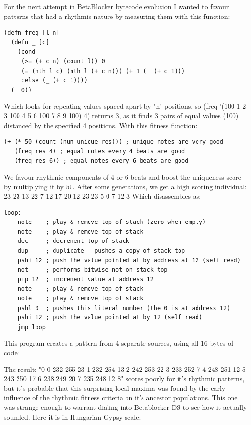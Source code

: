 \documentclass[letterpaper, 12pt]{article}
\begin{document}
For the next attempt in BetaBlocker bytecode evolution I wanted to favour patterns that had a rhythmic nature by measuring them with this function:

\begin{Verbatim}[fontfamily=courier, xleftmargin=\parindent]
(defn freq [l n]
  (defn _ [c]
    (cond
     (>= (+ c n) (count l)) 0
     (= (nth l c) (nth l (+ c n))) (+ 1 (_ (+ c 1)))
     :else (_ (+ c 1))))
  (_ 0))
\end{Verbatim}

Which looks for repeating values spaced apart by "n" positions, so (freq '(100 1 2 3 100 4 5 6 100 7 8 9 100) 4) returns 3, as it finds 3 pairs of equal values (100) distanced by the specified 4 positions.
With this fitness function:

\begin{Verbatim}[fontfamily=courier, xleftmargin=\parindent]
(+ (* 50 (count (num-unique res))) ; unique notes are very good
   (freq res 4) ; equal notes every 4 beats are good
   (freq res 6)) ; equal notes every 6 beats are good
\end{Verbatim}

We favour rhythmic components of 4 or 6 beats and boost the uniqueness score by multiplying it by 50. After some generations, we get a high scoring individual: 23 23 13 22 7 12 17 20 12 23 23 5 0 7 12 3 
Which disassembles as:

\begin{Verbatim}[fontfamily=courier, xleftmargin=\parindent]
loop:
    note    ; play & remove top of stack (zero when empty)
    note    ; play & remove top of stack
    dec     ; decrement top of stack
    dup     ; duplicate - pushes a copy of stack top 
    pshi 12 ; push the value pointed at by address at 12 (self read)
    not     ; performs bitwise not on stack top
    pip 12  ; increment value at address 12
    note    ; play & remove top of stack
    note    ; play & remove top of stack
    pshl 0  ; pushes this literal number (the 0 is at address 12)
    pshi 12 ; push the value pointed at by 12 (self read)
    jmp loop
\end{Verbatim}
    
This program creates a pattern from 4 separate sources, using all 16 bytes of code:


The result: "0 0 232 255 23 1 232 254 13 2 242 253 22 3 233 252 7 4 248 251 12 5 243 250 17 6 238 249 20 7 235 248 12 8" scores poorly for it's rhythmic patterns, but it's probable that this surprising local maxima was found by the early influence of the rhythmic fitness criteria on it's ancestor populations. 
This one was strange enough to warrant dialing into Betablocker DS to see how it actually sounded. Here it is in Hungarian Gypsy scale:
\end{document}
